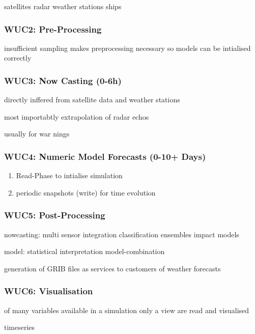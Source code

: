 {satellites
radar
weather stations
ships

\subsubsection{WUC2: Pre-Processing}

insufficient sampling makes preprocessing necessary so models can be intialised correctly


\subsubsection{WUC3: Now Casting (0-6h)}

directly inffered from satellite data and weather stations

most importabtly extrapolation of radar echos

usually for war nings




\subsubsection{WUC4: Numeric Model Forecasts (0-10+ Days)}

\begin{enumerate}
	\item Read-Phase to intialise simulation
	\item periodic snapshots (write) for time evolution
\end{enumerate}


\subsubsection{WUC5: Post-Processing}

nowcasting:
multi sensor integration
classification
ensembles
impact models

model:
statistical interpretation
model-combination



generation of GRIB files as services to customers of weather forecasts


\subsubsection{WUC6: Visualisation}

of many variables available in a simulation only a view are read and visualised

timeseries




}
